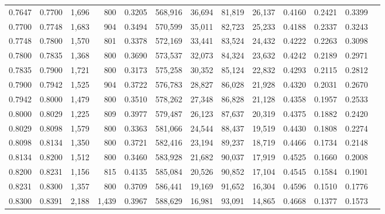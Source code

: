 \begin{tabular}{rrrrrrrrrrrrr}
0.7647 & 0.7700 &  1,696 &   800 &                                     0.3205 & 568,916 &  36,694 &  81,819 &  26,137 & 0.4160 & 0.2421 & 0.3399 \\
0.7700 & 0.7748 &  1,683 &   904 &                                     0.3494 & 570,599 &  35,011 &  82,723 &  25,233 & 0.4188 & 0.2337 & 0.3243 \\
0.7748 & 0.7800 &  1,570 &   801 &                                     0.3378 & 572,169 &  33,441 &  83,524 &  24,432 & 0.4222 & 0.2263 & 0.3098 \\
0.7800 & 0.7835 &  1,368 &   800 &                                     0.3690 & 573,537 &  32,073 &  84,324 &  23,632 & 0.4242 & 0.2189 & 0.2971 \\
0.7835 & 0.7900 &  1,721 &   800 &                                     0.3173 & 575,258 &  30,352 &  85,124 &  22,832 & 0.4293 & 0.2115 & 0.2812 \\
0.7900 & 0.7942 &  1,525 &   904 &                                     0.3722 & 576,783 &  28,827 &  86,028 &  21,928 & 0.4320 & 0.2031 & 0.2670 \\
0.7942 & 0.8000 &  1,479 &   800 &                                     0.3510 & 578,262 &  27,348 &  86,828 &  21,128 & 0.4358 & 0.1957 & 0.2533 \\
0.8000 & 0.8029 &  1,225 &   809 &                                     0.3977 & 579,487 &  26,123 &  87,637 &  20,319 & 0.4375 & 0.1882 & 0.2420 \\
0.8029 & 0.8098 &  1,579 &   800 &                                     0.3363 & 581,066 &  24,544 &  88,437 &  19,519 & 0.4430 & 0.1808 & 0.2274 \\
0.8098 & 0.8134 &  1,350 &   800 &                                     0.3721 & 582,416 &  23,194 &  89,237 &  18,719 & 0.4466 & 0.1734 & 0.2148 \\
0.8134 & 0.8200 &  1,512 &   800 &                                     0.3460 & 583,928 &  21,682 &  90,037 &  17,919 & 0.4525 & 0.1660 & 0.2008 \\
0.8200 & 0.8231 &  1,156 &   815 &                                     0.4135 & 585,084 &  20,526 &  90,852 &  17,104 & 0.4545 & 0.1584 & 0.1901 \\
0.8231 & 0.8300 &  1,357 &   800 &                                     0.3709 & 586,441 &  19,169 &  91,652 &  16,304 & 0.4596 & 0.1510 & 0.1776 \\
0.8300 & 0.8391 &  2,188 & 1,439 &                                     0.3967 & 588,629 &  16,981 &  93,091 &  14,865 & 0.4668 & 0.1377 & 0.1573 \\

\end{tabular}
